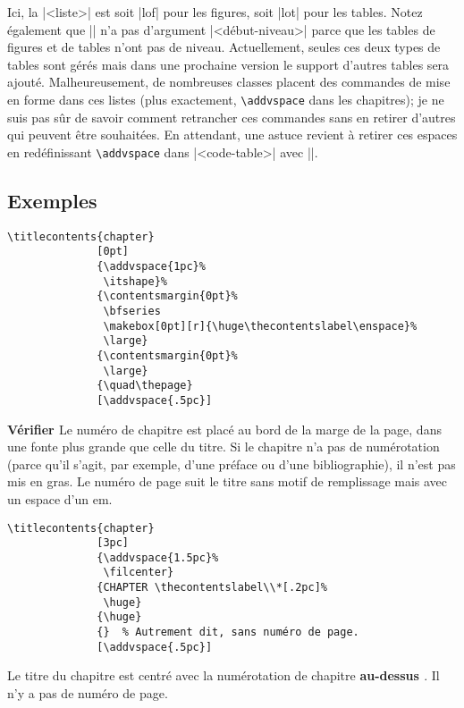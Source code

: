 \documentclass[a4paper]{ltxguide}
\newcommand{\trad}[1]{\textbf{\textcolor{orange5}{\noindent\ding{54} #1 \ding{54}}}}
\begin{document}
Ici, la |<liste>| est soit |lof| pour les figures, soit |lot| pour les tables.
Notez également que |\printlist| n'a pas d'argument |<début-niveau>| parce que
les tables de figures et de tables n'ont pas de niveau. Actuellement, seules
ces deux types de tables sont gérés mais dans une prochaine version le support
d'autres tables sera ajouté. Malheureusement, de nombreuses classes placent
des commandes de mise en forme dans ces listes (plus exactement, 
\verb|\addvspace| dans les chapitres); je ne suis pas sûr de savoir comment
retrancher ces commandes sans en retirer d'autres qui peuvent être souhaitées. 
En attendant, une astuce revient à retirer ces espaces en redéfinissant
\verb|\addvspace| dans |<code-table>| avec |\renewcommand\addvspace[1]{}|.

\subsection{Exemples}

\begin{verbatim}
\titlecontents{chapter}
              [0pt]
              {\addvspace{1pc}%
               \itshape}%
              {\contentsmargin{0pt}%
               \bfseries
               \makebox[0pt][r]{\huge\thecontentslabel\enspace}%
               \large}
              {\contentsmargin{0pt}%
               \large}
              {\quad\thepage}
              [\addvspace{.5pc}]
\end{verbatim}

\trad{Vérifier} Le numéro de chapitre est placé au bord de la marge de la
page, dans une fonte plus grande que celle du titre. Si le chapitre n'a
pas de numérotation (parce qu'il s'agit, par exemple, d'une préface ou
d'une bibliographie), il n'est pas mis en gras.  Le numéro de page suit
le titre sans motif de remplissage mais avec un espace d'un em.

\begin{verbatim}
\titlecontents{chapter}
              [3pc]
              {\addvspace{1.5pc}%
               \filcenter}
              {CHAPTER \thecontentslabel\\*[.2pc]%
               \huge}
              {\huge}
              {}  % Autrement dit, sans numéro de page.
              [\addvspace{.5pc}]
\end{verbatim}
              
Le titre du chapitre est centré avec la numérotation de chapitre 
\trad{au-dessus}. Il n'y a pas de numéro de page.
\end{document}
